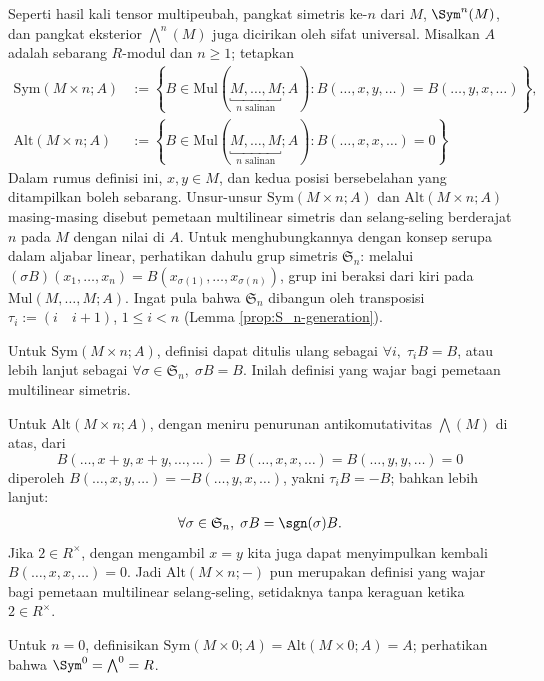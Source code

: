 Seperti hasil kali tensor multipeubah, pangkat simetris ke-$n$ dari $M$, $\Sym^n(M)$, dan pangkat eksterior $\bigwedge^n(M)$ juga dicirikan oleh sifat universal. Misalkan $A$ adalah sebarang $R$-modul dan $n \geq 1$; tetapkan
\begin{align*}
	\text{Sym}(M \times n; A) & := \left\{ B \in \text{Mul}(\underbracket{M, \ldots, M}_{n \text{ salinan}}; A) : B(\ldots, x,y, \ldots) = B(\ldots, y,x, \ldots) \right\}, \\
	\text{Alt}(M \times n; A) & := \left\{ B \in \text{Mul}(\underbracket{M, \ldots, M}_{n \text{ salinan}}; A) : B(\ldots, x,x, \ldots)=0 \right\}
\end{align*}
Dalam rumus definisi ini, $x,y \in M$, dan kedua posisi bersebelahan yang ditampilkan boleh sebarang. Unsur-unsur $\text{Sym}(M \times n; A)$ dan $\text{Alt}(M \times n; A)$ masing-masing disebut pemetaan multilinear simetris dan selang-seling berderajat $n$ pada $M$ dengan nilai di $A$. Untuk menghubungkannya dengan konsep serupa dalam aljabar linear, perhatikan dahulu grup simetris $\mathfrak{S}_n$: melalui $(\sigma B)(x_1, \ldots, x_n) = B(x_{\sigma(1)}, \ldots, x_{\sigma(n)})$, grup ini beraksi dari kiri pada $\text{Mul}(M, \ldots, M; A)$. Ingat pula bahwa $\mathfrak{S}_n$ dibangun oleh transposisi $\tau_i := (i \quad i+1)$, $1 \leq i < n$ (Lemma \ref{prop:S_n-generation}).
\begin{compactitem}
	\item Untuk $\text{Sym}(M \times n; A)$, definisi dapat ditulis ulang sebagai $\forall i, \;\tau_i B = B$, atau lebih lanjut sebagai $\forall \sigma \in \mathfrak{S}_n,\; \sigma B =B$. Inilah definisi yang wajar bagi pemetaan multilinear simetris.
	\item Untuk $\text{Alt}(M \times n; A)$, dengan meniru penurunan antikomutativitas $\bigwedge(M)$ di atas, dari
	\[ B(\ldots, x+y, x+y, \ldots, \ldots) = B(\ldots, x,x, \ldots) = B(\ldots, y,y, \ldots) = 0\]
	diperoleh $B(\ldots, x,y, \ldots) = -B(\ldots, y,x, \ldots)$, yakni $\tau_i B = -B$; bahkan lebih lanjut:
		\begin{gather*}
			\forall \sigma \in \mathfrak{S}_n,\; \sigma B = \sgn(\sigma)B.
		\end{gather*}
		Jika $2 \in R^\times$, dengan mengambil $x=y$ kita juga dapat menyimpulkan kembali $B(\ldots, x,x, \ldots)=0$. Jadi $\text{Alt}(M \times n; -)$ pun merupakan definisi yang wajar bagi pemetaan multilinear selang-seling, setidaknya tanpa keraguan ketika $2 \in R^\times$.
\end{compactitem}
Untuk $n=0$, definisikan $\text{Sym}(M \times 0; A) = \text{Alt}(M \times 0; A) = A$; perhatikan bahwa $\Sym^0 = \bigwedge^0 = R$.

